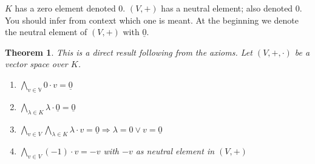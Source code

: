 \documentclass[a4paper,landscape,twocolumn]{article}
\newtheorem{theorem}{Theorem}
\begin{document}
$K$ has a zero element denoted $0$.
$(V, +)$ has a neutral element; also denoted $0$.
You should infer from context which one is meant.
At the beginning we denote the neutral element of $(V, +)$ with $\underline{0}$.

\begin{theorem}
  \label{thm:axiom-cor}
  This is a direct result following from the axioms.
  Let $(V, +, \cdot)$ be a vector space over $K$.
  \begin{enumerate}
    \item $\bigwedge_{v \in \mathbb V} 0 \cdot v = \underline{0}$
    \item $\bigwedge_{\lambda \in K} \lambda \cdot \underline{0} = \underline{0}$
    \item $\bigwedge_{v \in V} \bigwedge_{\lambda \in K} \lambda \cdot v = \underline{0} \Rightarrow \lambda = 0 \lor v = \underline{0}$
    \item $\bigwedge_{v \in V} (-1) \cdot v = -v$ with $-v$ as neutral element in $(V, +)$
  \end{enumerate}
\end{theorem}
\end{document}

